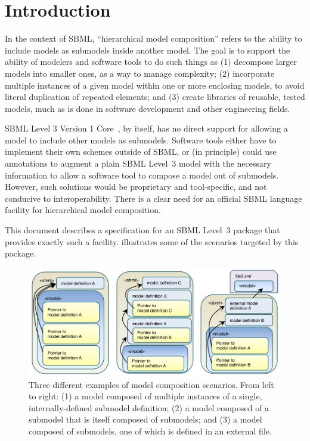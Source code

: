 
\section{Introduction}
\label{intro}

In the context of SBML, ``hierarchical model composition'' refers to the
ability to include models as submodels inside another model. The goal is
to support the ability of modelers and software tools to do such things
as (1) decompose larger models into smaller ones, as a way to manage
complexity; (2) incorporate multiple instances of a given model within
one or more enclosing models, to avoid literal duplication of repeated
elements; and (3) create libraries of reusable, tested models, much as
is done in software development and other engineering fields.

SBML Level 3 Version 1 Core~\citep{l3v1c}, by itself, has no direct
support for allowing a model to include other models as submodels.
Software tools either have to implement their own schemes outside of
SBML, or (in principle) could use annotations to augment a plain SBML
Level~3 model with the necessary information to allow a software tool to
compose a model out of submodels.  However, such solutions would be
proprietary and tool-specific, and not conducive to interoperability.
There is a clear need for an official SBML language facility for
hierarchical model composition.

This document describes a specification for an SBML Level~3 package that
provides exactly such a facility.   illustrates some of the
scenarios targeted by this package.

\begin{figure}[hb]
  \includegraphics{figs/figure1}
  \caption{Three different examples of model composition scenarios.
    From left to right: (1) a model composed of multiple instances of a
    single, internally-defined submodel definition; (2) a model composed
    of a submodel that is itself composed of submodels; and (3) a model
    composed of submodels, one of which is defined in an external file.}
  \label{fig1}
\end{figure}

